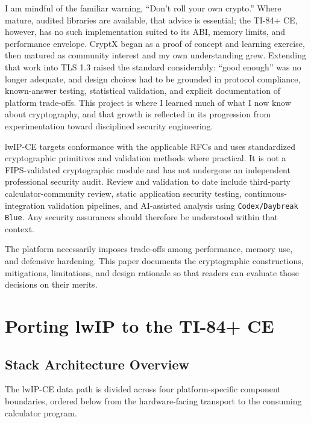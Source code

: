 \documentclass[titlepage]{report}
\begin{document}
	I am mindful of the familiar warning, ``Don't roll your own crypto.'' Where mature, audited libraries are available, that advice is essential; the TI-84+ CE, however, has no such implementation suited to its ABI, memory limits, and performance envelope. CryptX began as a proof of concept and learning exercise, then matured as community interest and my own understanding grew. Extending that work into TLS 1.3 raised the standard considerably: ``good enough'' was no longer adequate, and design choices had to be grounded in protocol compliance, known-answer testing, statistical validation, and explicit documentation of platform trade-offs. This project is where I learned much of what I now know about cryptography, and that growth is reflected in its progression from experimentation toward disciplined security engineering.

	lwIP-CE targets conformance with the applicable RFCs and uses standardized cryptographic primitives and validation methods where practical. It is not a FIPS-validated cryptographic module and has not undergone an independent professional security audit. Review and validation to date include third-party calculator-community review, static application security testing, continuous-integration validation pipelines, and AI-assisted analysis using \texttt{Codex/Daybreak Blue}. Any security assurances should therefore be understood within that context.

	The platform necessarily imposes trade-offs among performance, memory use, and defensive hardening. This paper documents the cryptographic constructions, mitigations, limitations, and design rationale so that readers can evaluate those decisions on their merits.

	\newpage
	\section{Porting lwIP to the TI-84+ CE}
	\label{sec:porting}



	\subsection{Stack Architecture Overview}

		The lwIP-CE data path is divided across four platform-specific component boundaries, ordered below from the hardware-facing transport to the consuming calculator program.
\end{document}
